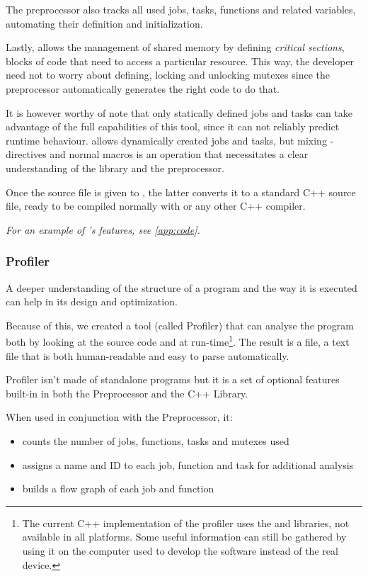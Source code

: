   The preprocessor also tracks all used jobs, tasks, functions and
  related variables, automating their definition and initialization.
  
  Lastly,  allows the management of shared memory
  by defining \textit{critical sections}, blocks of code that need
  to access a particular resource. This way, the developer need not
  to worry about defining, locking and unlocking mutexes since the
  preprocessor automatically generates the right code to do that.
  
  It is however worthy of note that only statically defined jobs and
  tasks can take advantage of the full capabilities of this tool,
  since it can not reliably predict runtime behaviour. \ScheMo{} allows
  dynamically created jobs and tasks, but mixing
  -directives and normal macros is an operation that
  necessitates a clear understanding of the library and the
  preprocessor.
  
  Once the source file is given to , the latter
  converts it to a standard C++ source file, ready to be compiled
  normally with  or any other C++ compiler.
  
  \textit{For an example of \ScheMo{}'s features, see \autoref{app:code}.}
  
\subsubsection{\ScheMo{} Profiler}
\label{sssec:schemoprofile}
  A deeper understanding of the structure of a \ScheMo{} program and the
  way it is executed can help in its design and optimization.

  Because of this, we created a tool (called \ScheMo{} Profiler) that can
  analyse the program both by looking at the source code and at
  run-time\footnote{The current C++ implementation of the profiler uses
  the  and  libraries, not available in all
  platforms. Some useful information can still be gathered by using it
  on the computer used to develop the software instead of the real
  device.}. The result is a  file, a text file that is
  both human-readable and easy to parse automatically.

  \ScheMo{} Profiler isn't made of standalone programs but it is
  a set of optional features built-in in both the \ScheMo{} Preprocessor
  and the \ScheMo{} C++ Library.
  
  When used in conjunction with the \ScheMo{} Preprocessor, it:
  \begin{itemize}
    \item counts the number of jobs, functions, tasks and mutexes used
    \item assigns a name and ID to each job, function and task for
      additional analysis
    \item builds a flow graph of each job and function
  \end{itemize}

